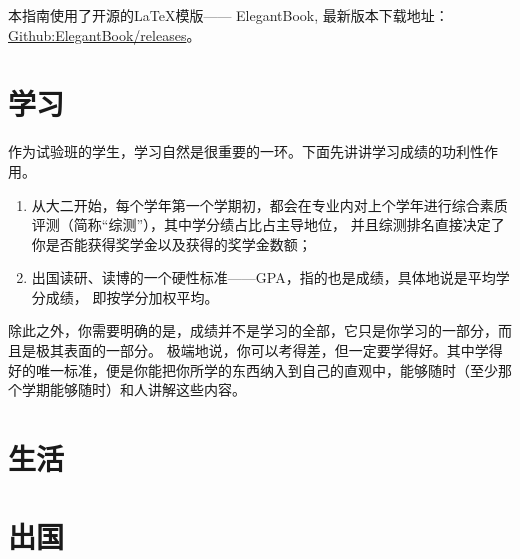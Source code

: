 \documentclass[cn]{elegantbook}
\begin{document}
本指南使用了开源的\LaTeX{}模版—— ElegantBook, 最新版本下载地址：\href{https://github.com/ElegantLaTeX/ElegantBook/releases}{Github:ElegantBook/releases}。






\chapter{学习}
作为试验班的学生，学习自然是很重要的一环。下面先讲讲学习成绩的功利性作用。
\begin{enumerate}
 \item 从大二开始，每个学年第一个学期初，都会在专业内对上个学年进行综合素质评测（简称“综测”），其中学分绩占比占主导地位，
 并且综测排名直接决定了你是否能获得奖学金以及获得的奖学金数额；
 \item 出国读研、读博的一个硬性标准——GPA，指的也是成绩，具体地说是平均学分成绩， 即按学分加权平均。
\end{enumerate}
除此之外，你需要明确的是，成绩并不是学习的全部，它只是你学习的一部分，而且是极其表面的一部分。
极端地说，你可以考得差，但一定要学得好。其中学得好的唯一标准，便是你能把你所学的东西纳入到自己的直观中，能够随时（至少那个学期能够随时）和人讲解这些内容。













\chapter{生活}


       








\chapter{出国}






\end{document}
